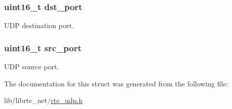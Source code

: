\subsubsection[{dst\+\_\+port}]{\setlength{\rightskip}{0pt plus 5cm}uint16\+\_\+t dst\+\_\+port}\label{structudp__hdr_ae18defed4756b8c15e34718f51e86e55}
U\+D\+P destination port. \hypertarget{structudp__hdr_ab98974981cf4c143fcee028643f313e6}{}
\subsubsection[{src\+\_\+port}]{\setlength{\rightskip}{0pt plus 5cm}uint16\+\_\+t src\+\_\+port}\label{structudp__hdr_ab98974981cf4c143fcee028643f313e6}
U\+D\+P source port. 

The documentation for this struct was generated from the following file\+:\begin{DoxyCompactItemize}
\item 
lib/librte\+\_\+net/\hyperlink{rte__udp_8h}{rte\+\_\+udp.\+h}\end{DoxyCompactItemize}
